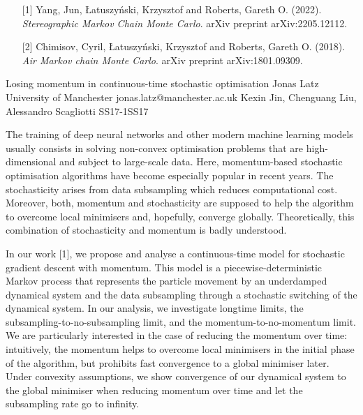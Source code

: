 \begin{talk}
\begin{enumerate}
	\item[{[1]}] Yang, Jun, {\L}atuszy{\'n}ski, Krzysztof and Roberts, Gareth O. (2022). {\it Stereographic Markov Chain Monte Carlo}. arXiv preprint arXiv:2205.12112.
	\item[{[2]}] Chimisov, Cyril, {\L}atuszy{\'n}ski, Krzysztof and Roberts, Gareth O. (2018). {\it Air Markov chain Monte Carlo}. arXiv preprint arXiv:1801.09309.
\end{enumerate}
\end{talk}

\begin{talk}
  {Losing momentum in continuous-time stochastic optimisation}%
  {Jonas Latz}%
  {University of Manchester}%
  {jonas.latz@manchester.ac.uk}%
  {Kexin Jin, Chenguang Liu, Alessandro Scagliotti}%
{}{}{SS17-1}{SS17}

			
The training of deep neural networks and other modern machine learning models usually consists in solving non-convex optimisation problems that are high-dimensional and subject to large-scale data. Here, momentum-based stochastic optimisation algorithms have become especially popular in recent years. The stochasticity arises from data subsampling which reduces computational cost. Moreover, both, momentum and stochasticity are supposed to help the algorithm to overcome local minimisers and, hopefully, converge globally. Theoretically, this combination of stochasticity and momentum is badly understood.

In our work [1], we propose and analyse a continuous-time model for stochastic gradient descent with momentum. This model is a piecewise-deterministic Markov process that represents the particle movement by an underdamped dynamical system and the data subsampling through a stochastic switching of the dynamical system. In our analysis, we investigate longtime limits, the subsampling-to-no-subsampling limit, and the momentum-to-no-momentum limit. We are particularly interested in the case of reducing the momentum over time: intuitively, the momentum helps to overcome local minimisers in the initial phase of the algorithm, but prohibits fast convergence to a global minimiser later. Under convexity assumptions, we show convergence of our dynamical system to the global minimiser when reducing momentum over time and let the subsampling rate go to infinity.


\end{talk}
